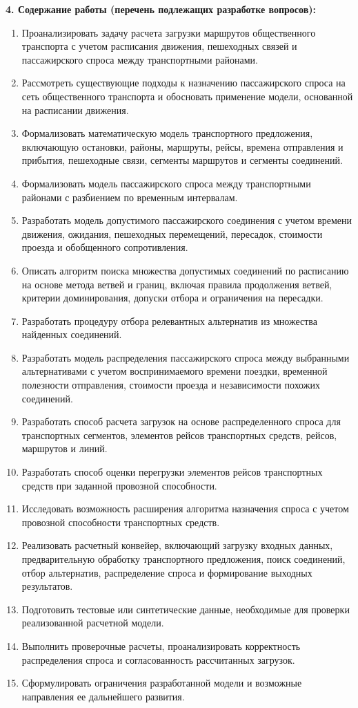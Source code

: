 \documentclass[14pt,a4paper]{extarticle}
\begin{document}
\textbf{4. Содержание работы (перечень подлежащих разработке вопросов):}
\begin{enumerate}
  \item Проанализировать задачу расчета загрузки маршрутов общественного транспорта с учетом расписания движения, пешеходных связей и пассажирского спроса между транспортными районами.
  \item Рассмотреть существующие подходы к назначению пассажирского спроса на сеть общественного транспорта и обосновать применение модели, основанной на расписании движения.
  \item Формализовать математическую модель транспортного предложения, включающую остановки, районы, маршруты, рейсы, времена отправления и прибытия, пешеходные связи, сегменты маршрутов и сегменты соединений.
  \item Формализовать модель пассажирского спроса между транспортными районами с разбиением по временным интервалам.
  \item Разработать модель допустимого пассажирского соединения с учетом времени движения, ожидания, пешеходных перемещений, пересадок, стоимости проезда и обобщенного сопротивления.
  \item Описать алгоритм поиска множества допустимых соединений по расписанию на основе метода ветвей и границ, включая правила продолжения ветвей, критерии доминирования, допуски отбора и ограничения на пересадки.
  \item Разработать процедуру отбора релевантных альтернатив из множества найденных соединений.
  \item Разработать модель распределения пассажирского спроса между выбранными альтернативами с учетом воспринимаемого времени поездки, временной полезности отправления, стоимости проезда и независимости похожих соединений.
  \item Разработать способ расчета загрузок на основе распределенного спроса для транспортных сегментов, элементов рейсов транспортных средств, рейсов, маршрутов и линий.
  \item Разработать способ оценки перегрузки элементов рейсов транспортных средств при заданной провозной способности.
  \item Исследовать возможность расширения алгоритма назначения спроса с учетом провозной способности транспортных средств.
  \item Реализовать расчетный конвейер, включающий загрузку входных данных, предварительную обработку транспортного предложения, поиск соединений, отбор альтернатив, распределение спроса и формирование выходных результатов.
  \item Подготовить тестовые или синтетические данные, необходимые для проверки реализованной расчетной модели.
  \item Выполнить проверочные расчеты, проанализировать корректность распределения спроса и согласованность рассчитанных загрузок.
  \item Сформулировать ограничения разработанной модели и возможные направления ее дальнейшего развития.
\end{enumerate}
\end{document}
